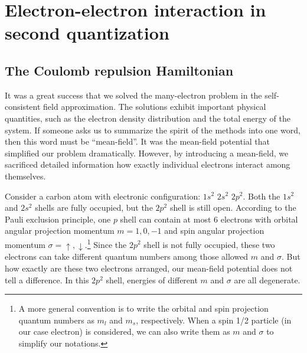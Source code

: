 \chapter{Electron-electron interaction in second quantization} \label{ch:4}

\section{The Coulomb repulsion Hamiltonian}
It was a great success that we solved the many-electron problem in
the self-consistent field approximation. The solutions exhibit important
physical quantities, such as the electron density distribution and the total energy of the system.
If someone asks us to summarize the spirit of the methods into one word,
then this word must be ``mean-field''. It was the mean-field potential
that simplified our problem dramatically.
However, by introducing a mean-field, we sacrificed detailed information
how exactly individual electrons interact among themselves.

Consider a carbon atom with electronic configuration: $1s^2$ $2s^2$ $2p^2$.
Both the $1s^2$ and $2s^2$ shells are fully occupied, but the $2p^2$ shell is
still open. According to the Pauli exclusion principle, one $p$ shell can contain
at most 6 electrons with orbital angular projection momentum $m=1,0,-1$ and spin angular
projection momentum $\sigma=\uparrow,\downarrow$.\footnote{A more general convention
is to write the orbital and spin projection quantum numbers as $m_l$ and $m_s$, respectively.
When a spin 1/2 particle (in our case electron) is considered,
we can also write them as $m$ and $\sigma$ to simplify our notations.}
Since the $2p^2$ shell is not fully occupied, these two electrons can take
different quantum numbers among those allowed $m$ and $\sigma$.
But how exactly are these two electrons arranged, our mean-field potential
does not tell a difference. In this $2p^2$ shell, energies of
different $m$ and $\sigma$ are all degenerate.

